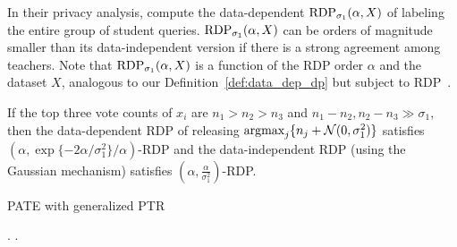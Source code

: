 In their privacy analysis,  \citet{papernot2018scalable} compute the data-dependent $\mathrm{RDP}_{\sigma_1}(\alpha, X)$ of labeling the entire group of student queries.  $\mathrm{RDP}_{\sigma_1}(\alpha, X)$ can be orders of magnitude smaller than its data-independent version if there is a strong agreement among teachers. Note that $\mathrm{RDP}_{\sigma_1}(\alpha, X)$  is a function of the RDP order $\alpha$ and the dataset $X$, analogous to our  Definition~\ref{def:data_dep_dp}  but subject to RDP~\citep{mironov2017renyi}.

\begin{theorem}\label{thm: dep_gau}
If the top three vote counts of $x_i$ are $n_1>n_2>n_3$ and $n_1 -n_2, n_2-n_3\gg \sigma_1$, then the data-dependent RDP of releasing $\text{argmax}_j \{n_j +\mathcal{N}(0, \sigma_1^2)\}$
satisfies $(\alpha, \exp\{-2\alpha/{\sigma_1^2}\}/\alpha)$-RDP and the data-independent RDP (using the Gaussian mechanism) satisfies $(\alpha, \frac{\alpha}{\sigma_1^2})$-RDP. 
\end{theorem}


\begin{algorithm}[H]
	\caption{PATE with generalized PTR}
	\label{alg: pate_ptr}
	\begin{algorithmic}[1]
		\STATE {}
		.
		.
	\end{algorithmic}
\end{algorithm}



